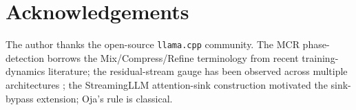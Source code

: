 \documentclass[11pt]{article}
\begin{document}
\section*{Acknowledgements}
The author thanks the open-source \texttt{llama.cpp} \cite{ggerganov2023gguf}
community.  The MCR phase-detection borrows the Mix/Compress/Refine
terminology from recent training-dynamics literature; the residual-stream
gauge has been observed across multiple architectures
\cite{elhage2022superposition}; the StreamingLLM attention-sink
construction \cite{xiao2023streamingllm} motivated the sink-bypass
extension; Oja's rule \cite{oja1982} is classical.

\printbibliography
\end{document}
